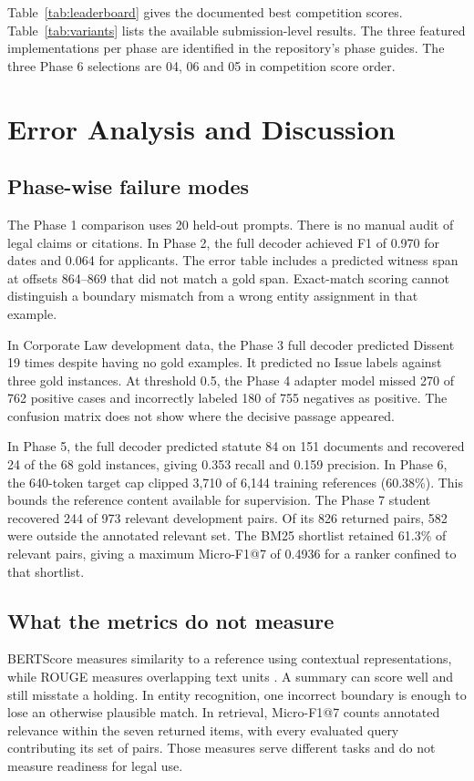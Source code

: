 \documentclass[11pt, oneside]{article}
\begin{document}
Table~\ref{tab:leaderboard} gives the documented best competition scores. Table~\ref{tab:variants} lists the available submission-level results. The three featured implementations per phase are identified in the repository's phase guides. The three Phase 6 selections are 04, 06 and 05 in competition score order.

\section{Error Analysis and Discussion}

\subsection{Phase-wise failure modes}

The Phase 1 comparison uses 20 held-out prompts. There is no manual audit of legal claims or citations. In Phase 2, the full decoder achieved F1 of 0.970 for dates and 0.064 for applicants. The error table includes a predicted witness span at offsets 864--869 that did not match a gold span. Exact-match scoring cannot distinguish a boundary mismatch from a wrong entity assignment in that example.

In Corporate Law development data, the Phase 3 full decoder predicted Dissent 19 times despite having no gold examples. It predicted no Issue labels against three gold instances. At threshold 0.5, the Phase 4 adapter model missed 270 of 762 positive cases and incorrectly labeled 180 of 755 negatives as positive. The confusion matrix does not show where the decisive passage appeared.

In Phase 5, the full decoder predicted statute 84 on 151 documents and recovered 24 of the 68 gold instances, giving 0.353 recall and 0.159 precision. In Phase 6, the 640-token target cap clipped 3,710 of 6,144 training references (60.38\%). This bounds the reference content available for supervision. The Phase 7 student recovered 244 of 973 relevant development pairs. Of its 826 returned pairs, 582 were outside the annotated relevant set. The BM25 shortlist retained 61.3\% of relevant pairs, giving a maximum Micro-F1@7 of 0.4936 for a ranker confined to that shortlist.

\clearpage
\subsection{What the metrics do not measure}

BERTScore measures similarity to a reference using contextual representations, while ROUGE measures overlapping text units \citep{bertscore,rouge}. A summary can score well and still misstate a holding. In entity recognition, one incorrect boundary is enough to lose an otherwise plausible match. In retrieval, Micro-F1@7 counts annotated relevance within the seven returned items, with every evaluated query contributing its set of pairs. Those measures serve different tasks and do not measure readiness for legal use.
\end{document}
